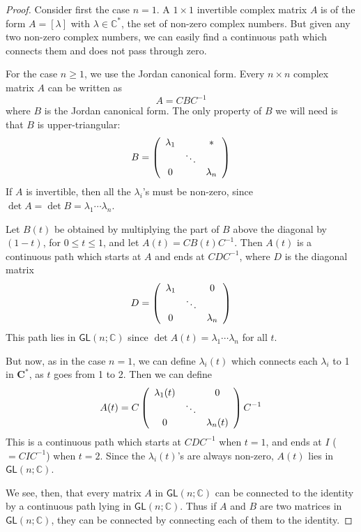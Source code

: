 \documentclass[12pt]{amsbook}
\theoremstyle{plain}
\numberwithin{equation}{chapter}
\numberwithin{theorem}{chapter}
\begin{document}
\begin{proof}
Consider first the case $n=1$. A $1\times1$ invertible complex matrix $A$ is
of the form $A=\left[  \lambda\right]  $ with $\lambda\in\mathbb{C}^{\ast}$,
the set of non-zero complex numbers. But given any two non-zero complex
numbers, we can easily find a continuous path which connects them and does not
pass through zero.

For the case $n\geq1$, we use the Jordan canonical form. Every $n\times n$
complex matrix $A$ can be written as
\[
A=CBC^{-1}%
\]
where $B$ is the Jordan canonical form. The only property of $B$ we will need
is that $B$ is upper-triangular:
\[
B=\left(
\begin{array}
[c]{ccc}%
\lambda_{1} &  & \ast\\
& \ddots & \\
0 &  & \lambda_{n}%
\end{array}
\right)
\]
If $A$ is invertible, then all the $\lambda_{i}$'s must be non-zero, since
$\det A=\det B=\lambda_{1}\cdots\lambda_{n}$.

Let $B(t)$ be obtained by multiplying the part of $B$ above the diagonal by
$(1-t)$, for $0\leq t\leq1$, and let $A(t)=CB(t)C^{-1}$. Then $A(t)$ is a
continuous path which starts at $A$ and ends at $CDC^{-1}$, where $D$ is the
diagonal matrix
\[
D=\left(
\begin{array}
[c]{ccc}%
\lambda_{1} &  & 0\\
& \ddots & \\
0 &  & \lambda_{n}%
\end{array}
\right)
\]
This path lies in $\mathsf{GL}(n;\mathbb{C})$ since $\det A(t)=\lambda
_{1}\cdots\lambda_{n}$ for all $t$.

But now, as in the case $n=1$, we can define $\lambda_{i}(t)$ which connects
each $\lambda_{i}$ to 1 in $\mathbf{C}^{\ast}$, as $t$ goes from 1 to 2. Then
we can define
\[
A(t)=C\left(
\begin{array}
[c]{ccc}%
\lambda_{1}(t) &  & 0\\
& \ddots & \\
0 &  & \lambda_{n}(t)
\end{array}
\right)  C^{-1}%
\]
This is a continuous path which starts at $CDC^{-1}$ when $t=1$, and ends at
$I$ ($=CIC^{-1}$) when $t=2$. Since the $\lambda_{i}(t)$'s are always
non-zero, $A(t)$ lies in $\mathsf{GL}(n;\mathbb{C})$.

We see, then, that every matrix $A$ in $\mathsf{GL}(n;\mathbb{C})$ can be
connected to the identity by a continuous path lying in $\mathsf{GL}%
(n;\mathbb{C})$. Thus if $A$ and $B$ are two matrices in $\mathsf{GL}%
(n;\mathbb{C})$, they can be connected by connecting each of them to the identity.
\end{proof}
\end{document}
